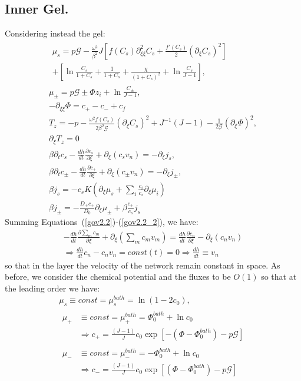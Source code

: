 \documentclass[12pt]{extarticle}
\begin{document}
\subsection{Inner Gel.}
Considering instead the gel:
\begin{gather}
\begin{aligned}
\mu_s = p \mathcal{G} - \frac{\omega^2}{\beta^2} J \left[f(C_s)\partial_{\xi\xi}^2 C_s+\frac{f'(C_s)}{2}\left(\partial_\xi C_s\right)^2\right]\\
+ \left[\ln \frac{C_s}{1+C_s} + \frac{1}{1+C_s}+\frac{\chi}{(1+C_s)^2} + \ln \frac{C_s}{J-1} \right], 
\end{aligned}\label{mus2.2}\\[2.5mm]
\mu_\pm = p \mathcal{G} \pm \Phi z_i + \ln \frac{C_\pm}{J-1} ,\\
-\partial_{\xi\xi} \Phi = c_+-c_-+c_f\,\label{Poi2.2} \\
T_z= -p-\frac{\omega^2 f(C_s)}{2\beta^2\mathcal{G}} (\partial_\xi C_s)^2+ J^{-1}\left(J-1\right)-\frac{1}{2\mathcal{G}} (\partial_\xi \Phi)^2,\label{T2.2}\\
\partial_\xi T_z=0\\
\beta \partial_t c_s -\frac{dh}{dt}\frac{\partial c_s}{\partial \xi}+\partial_\xi (c_s v_n)= - \partial_\xi j_s,\label{gov2.2}\\
\beta \partial_t c_\pm -\frac{dh}{dt}\frac{\partial c_\pm}{\partial \xi}+\partial_\xi (c_\pm v_n)= -\partial_\xi j_\pm,\label{gov2.2_2}\\
\beta j_s =-c_s K  \left(\partial_\xi\mu_s +\sum_i \frac{c_i}{c_s} \partial_\xi \mu_i\right)\\
\beta j_\pm= - \frac{D_\pm c_\pm}{D_0}\partial_\xi \mu_\pm + \beta \frac{c_\pm}{c_s}j_s
\end{gather}
Summing Equations~(\ref{gov2.2})-(\ref{gov2.2_2}), we have:
\begin{equation}
\begin{aligned}
-\frac{dh}{dt}\frac{\partial \sum_m c_m}{\partial \xi}+ \partial_\xi \left(\sum_m c_m v_m\right)= \frac{dh}{dt}\frac{\partial c_n}{\partial \xi}-\partial_\xi (c_n v_n)\\
\Rightarrow  \frac{dh}{dt} c_n -c_n v_n=const(t)=0 \Rightarrow  \frac{dh}{dt} \equiv v_n
\end{aligned}
\end{equation}
so that in the layer the velocity of the network remain constant in space.
As before, we consider the chemical potential and the fluxes to be $O(1)$ so that at the leading order we have:
\begin{gather}
\mu_s \equiv const = \mu^{bath}_s= \ln(1-2c_0),\\
\begin{aligned}
\mu_+ &\equiv const = \mu^{bath}_+=  \Phi_0^{bath} + \ln c_0 \\&\Rightarrow c_+=\frac{(J-1)}{J}c_0\exp[-(\Phi-\Phi_0^{bath})-p\mathcal{G}]
\end{aligned}\\
\begin{aligned}
\mu_- &\equiv const = \mu^{bath}_-= - \Phi_0^{bath} + \ln c_0\\ &\Rightarrow c_-=\frac{(J-1)}{J}c_0\exp[(\Phi-\Phi_0^{bath})-p\mathcal{G}]
\end{aligned}
\end{gather}
\end{document}
